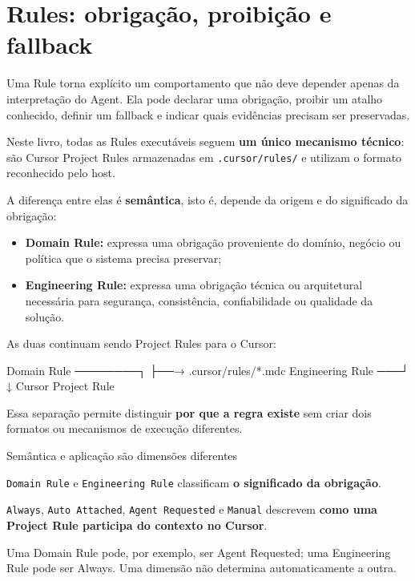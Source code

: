 \documentclass[
  10pt,
  a4paper,
  oneside]{book}
\newenvironment{Shaded}{}{}
\newcommand{\NormalTok}[1]{#1}
\providecommand{\tightlist}{%
  \setlength{\itemsep}{0pt}\setlength{\parskip}{0pt}}
\renewenvironment{Shaded}{\begin{snugshade}}{\end{snugshade}}%
\begin{document}
\hypertarget{rules-obrigauxe7uxe3o-proibiuxe7uxe3o-e-fallback}{%
\chapter{Rules: obrigação, proibição e
fallback}\label{rules-obrigauxe7uxe3o-proibiuxe7uxe3o-e-fallback}}

Uma Rule torna explícito um comportamento que não deve depender apenas
da interpretação do Agent. Ela pode declarar uma obrigação, proibir um
atalho conhecido, definir um fallback e indicar quais evidências
precisam ser preservadas.

Neste livro, todas as Rules executáveis seguem \textbf{um único
mecanismo técnico}: são Cursor Project Rules armazenadas em
\texttt{.cursor/rules/} e utilizam o formato reconhecido pelo host.

A diferença entre elas é \textbf{semântica}, isto é, depende da origem e
do significado da obrigação:

\begin{itemize}
\tightlist
\item
  \textbf{Domain Rule:} expressa uma obrigação proveniente do domínio,
  negócio ou política que o sistema precisa preservar;
\item
  \textbf{Engineering Rule:} expressa uma obrigação técnica ou
  arquitetural necessária para segurança, consistência, confiabilidade
  ou qualidade da solução.
\end{itemize}

As duas continuam sendo Project Rules para o Cursor:

\begin{Shaded}
\begin{Highlighting}[]
\NormalTok{Domain Rule ────────┐}
\NormalTok{                    ├──→ .cursor/rules/*.mdc}
\NormalTok{Engineering Rule ───┘        ↓}
\NormalTok{                       Cursor Project Rule}
\end{Highlighting}
\end{Shaded}

Essa separação permite distinguir \textbf{por que a regra existe} sem
criar dois formatos ou mecanismos de execução diferentes.

\begin{infobox}{Semântica e aplicação são dimensões diferentes}

\texttt{Domain\ Rule} e \texttt{Engineering\ Rule} classificam \textbf{o
significado da obrigação}.

\texttt{Always}, \texttt{Auto\ Attached}, \texttt{Agent\ Requested} e
\texttt{Manual} descrevem \textbf{como uma Project Rule participa do
contexto no Cursor}.

Uma Domain Rule pode, por exemplo, ser Agent Requested; uma Engineering
Rule pode ser Always. Uma dimensão não determina automaticamente a
outra.

\end{infobox}
\end{document}
